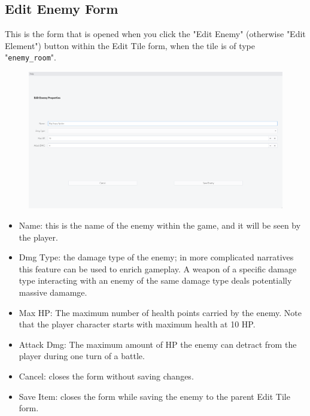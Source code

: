\documentclass{article} \usepackage[margin=1in,headheight=57pt,headsep=0.1in]{geometry}
\begin{document}
\newpage
\subsection{Edit Enemy Form}
This is the form that is opened when you click the "Edit Enemy" (otherwise "Edit Element") button within the Edit Tile form, when the tile is of type "\texttt{enemy\_room}".
\begin{figure}[H]
	\centering
	\includegraphics[width=1.0\textwidth]{./editEnemyForm.png}
\end{figure}
\begin{itemize}
	\item Name: this is the name of the enemy within the game, and it will be seen by the player.
	\item Dmg Type: the damage type of the enemy; in more complicated narratives this feature can be used to enrich gameplay. A weapon of a specific damage type interacting with an enemy of the same damage type deals potentially massive damamge.
	\item Max HP: The maximum number of health points carried by the enemy. Note that the player character starts with maximum health at 10 HP.
	\item Attack Dmg: The maximum amount of HP the enemy can detract from the player during one turn of a battle.
	\item Cancel: closes the form without saving changes.
	\item Save Item: closes the form while saving the enemy to the parent Edit Tile form.
\end{itemize}
\newpage
\end{document}
